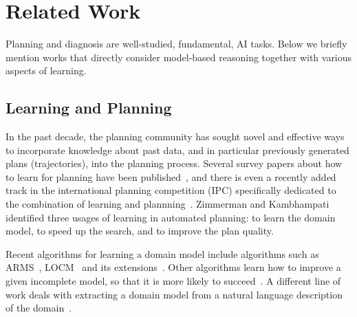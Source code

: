 \documentclass[12pt]{article}
\newcommand{\note}[1]{\textbf{\textit{#1}}}
\begin{document}
\section{Related Work}
Planning and diagnosis are well-studied, fundamental, AI tasks. %
Below we briefly mention works that directly consider model-based reasoning together with various aspects of learning. 

\subsection{Learning and Planning}


In the past decade, the planning community has sought novel and effective ways to incorporate knowledge about past data, and in particular previously generated plans (trajectories), into the planning process. 
Several survey papers about how to learn for planning have been published~\cite{minton2014machine,zimmerman2003learning,jimenez2012review}, 
and there is even a recently added track in the international planning competition (IPC) specifically dedicated to the combination of learning and plannning~\cite{fern2011first}. 
Zimmerman and Kambhampati~\cite{zimmerman2003learning} identified three usages of learning in automated planning: to learn the domain model, to speed up the search, and to improve the plan quality. 

 Recent algorithms for learning a domain model include algorithms such as ARMS~\cite{yang2007learning}, 
LOCM~\cite{cresswell2013acquiring} and its extensions~\cite{gregory2015domain,gregory2016domain}. 
Other algorithms learn how to improve a given incomplete model, so that it is more likely to succeed~\cite{nguyen2017robustPlanning,jimenez2012review}.
A different line of work deals with extracting a domain model from a natural language description of the domain~\cite{lindsay2017framer}.
\end{document}
